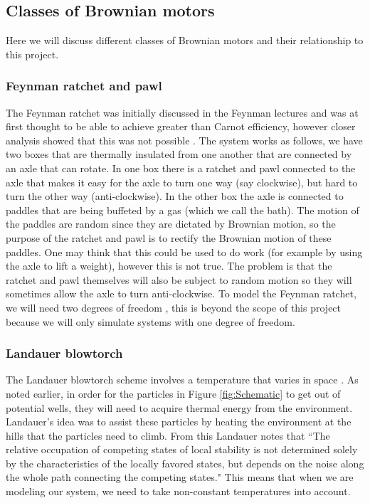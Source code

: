 \documentclass[11pt]{article} %
\begin{document}
\subsection{Classes of Brownian motors} \label{BrownianMotorClasses}
Here we will discuss different classes of Brownian motors and their relationship to this project.

\subsubsection{Feynman ratchet and pawl}
The Feynman ratchet was initially discussed in the Feynman lectures \cite{Feynman1963} and was at first thought to be able to achieve greater than Carnot efficiency, however closer analysis showed that this was not possible \cite{ParrondoEspanol1996}. The system works as follows, we have two boxes that are thermally insulated from one another that are connected by an axle that can rotate. In one box there is a ratchet and pawl connected to the axle that makes it easy for the axle to turn one way (say clockwise), but hard to turn the other way (anti-clockwise). In the other box the axle is connected to paddles that are being buffeted by a gas (which we call the bath). The motion of the paddles are random since they are dictated by Brownian motion, so the purpose of the ratchet and pawl is to rectify the Brownian motion of these paddles. One may think that this could be used to do work (for example by using the axle to lift a weight), however this is not true. The problem is that the ratchet and pawl themselves will also be subject to random motion so they will sometimes allow the axle to turn anti-clockwise. To model the Feynman ratchet, we will need two degrees of freedom \cite{M.W.Jack2016}, this is beyond the scope of this project because we will only simulate systems with one degree of freedom.

\subsubsection{Landauer blowtorch}
The Landauer blowtorch scheme involves a temperature that varies in space \cite{Landauer1988}. As noted earlier, in order for the particles in Figure \ref{fig:Schematic} to get out of potential wells, they will need to acquire thermal energy from the environment. Landauer's idea was to assist these particles by heating the environment at the hills that the particles need to climb. From this Landauer notes that \cite{Landauer1988} ``The relative occupation of competing states of local stability is not determined solely by the characteristics of the locally favored states, but depends on the noise along the whole path connecting the competing states." This means that when we are modeling our system, we need to take non-constant temperatures into account.
\end{document}
